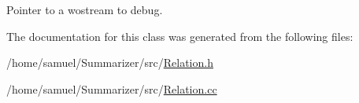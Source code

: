 Pointer to a wostream to debug. 



The documentation for this class was generated from the following files\+:\begin{DoxyCompactItemize}
\item 
/home/samuel/\+Summarizer/src/\hyperlink{Relation_8h}{Relation.\+h}\item 
/home/samuel/\+Summarizer/src/\hyperlink{Relation_8cc}{Relation.\+cc}\end{DoxyCompactItemize}
